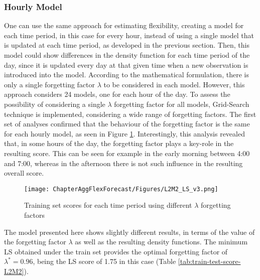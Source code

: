 \subsubsection{Hourly Model}  \label{Sect:ResultsLevel224hModel}

One can use the same approach for estimating flexibility, creating a model for each time period, in this case for every hour, instead of using a single model that is updated at each time period, as developed in the previous section. Then, this model could show differences in the density function for each time period of the day, since it is updated every day at that given time when a new observation is introduced into the model. According to the mathematical formulation, there is only a single forgetting factor $\lambda$ to be considered in each model. However, this approach considers 24 models, one for each hour of the day. To assess the possibility of considering a single $\lambda$ forgetting factor for all models, Grid-Search technique is implemented, considering a wide range of forgetting factors. The first set of analyses confirmed that the behaviour of the forgetting factor is the same for each hourly model, as seen in Figure \ref{fig:L2_M2_LS}. Interestingly, this analysis revealed that, in some hours of the day, the forgetting factor plays a key-role in the resulting score. This can be seen for example in the early morning between 4:00 and 7:00, whereas in the afternoon there is not such influence in the resulting overall score.  

\begin{figure}[htbp]
\centerline{\texttt{[image: ChapterAggFlexForecast/Figures/L2M2\_LS\_v3.png]}}
\caption{Training set scores for each time period using different $\lambda$ forgetting factors}
\label{fig:L2_M2_LS}
\end{figure}

The model presented here shows slightly different results, in terms of the value of the forgetting factor $\lambda$ as well as the resulting density functions. The minimum LS obtained under the train set provides the optimal forgetting factor of $\lambda^* = 0.96$, being the LS score of 1.75 in this case (Table \ref{tab:train-test-score-L2M2}). 




